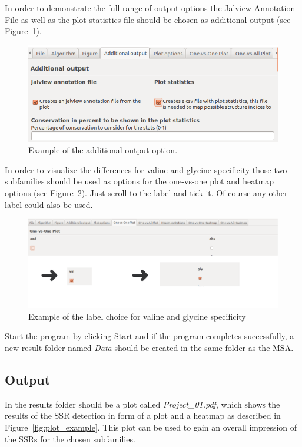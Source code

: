 \documentclass[a4paper,10pt]{article}
\begin{document}
In order to demonstrate the full range of output options the Jalview Annotation File as well as the plot statistics file should be chosen as additional output 
(see Figure~\ref{fig:ssr_extra}).

\begin{figure}
  \includegraphics[width=\linewidth]{./figs/ssr_extra}
  \caption{Example of the additional output option.}
  \label{fig:ssr_extra}
\end{figure}

In order to visualize the differences for valine and glycine specificity those two subfamilies should be used as options for the
one-vs-one plot and heatmap options (see Figure~\ref{fig:label_choice}). Just scroll to the label and tick it.
Of course any other label could also be used.

\begin{figure}
  \includegraphics[width=\linewidth]{./figs/label_choice}
  \caption{Example of the label choice for valine and glycine specificity}
  \label{fig:label_choice}
\end{figure}

Start the program by clicking Start and if the program completes successfully, a new result folder named \textit{Data} should be created in the same folder as the MSA.

\subsection{Output}

In the results folder should be a plot called \textit{Project\_01.pdf}, which shows the results of the SSR detection in form of a plot and a heatmap as 
described in Figure~\ref{fig:plot_example}. This plot can be used to gain an overall impression of the SSRs for the chosen subfamilies. 
\end{document}
